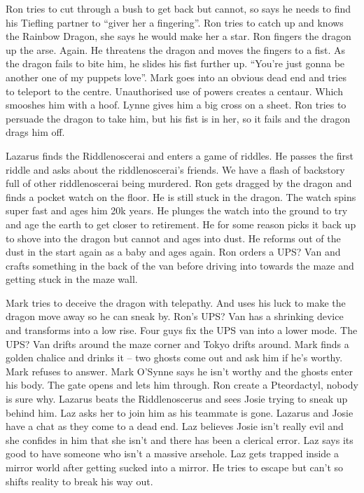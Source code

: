 Ron tries to cut through a bush to get back but cannot, so says he needs to find his Tiefling partner to “giver her a fingering”. Ron tries to catch up and knows the Rainbow Dragon, she says he would make her a star. Ron fingers the dragon up the arse. Again. He threatens the dragon and moves the fingers to a fist. As the dragon fails to bite him, he slides his fist further up. “You’re just gonna be another one of my puppets love”. Mark goes into an obvious dead end and tries to teleport to the centre. Unauthorised use of powers creates a centaur. Which smooshes him with a hoof. Lynne gives him a big cross on a sheet. Ron tries to persuade the dragon to take him, but his fist is in her, so it fails and the dragon drags him off.\medskip

Lazarus finds the Riddlenoscerai and enters a game of riddles. He passes the first riddle and asks about the riddlenoscerai’s friends. We have a flash of backstory full of other riddlenoscerai being murdered. Ron gets dragged by the dragon and finds a pocket watch on the floor. He is still stuck in the dragon. The watch spins super fast and ages him 20k years. He plunges the watch into the ground to try and age the earth to get closer to retirement. He for some reason picks it back up to shove into the dragon but cannot and ages into dust. He reforms out of the dust in the start again as a baby and ages again. Ron orders a UPS? Van and crafts something in the back of the van before driving into towards the maze and getting stuck in the maze wall.\medskip

Mark tries to deceive the dragon with telepathy. And uses his luck to make the dragon move away so he can sneak by. Ron’s UPS? Van has a shrinking device and transforms into a low rise. Four guys fix the UPS van into a lower mode. The UPS? Van drifts around the maze corner and Tokyo drifts around. Mark finds a golden chalice and drinks it – two ghosts come out and ask him if he’s worthy. Mark refuses to answer. Mark O’Synne says he isn’t worthy and the ghosts enter his body. The gate opens and lets him through. Ron create a Pteordactyl, nobody is sure why. Lazarus beats the Riddlenoscerus and sees Josie trying to sneak up behind him. Laz asks her to join him as his teammate is gone. Lazarus and Josie have a chat as they come to a dead end. Laz believes Josie isn’t really evil and she confides in him that she isn’t and there has been a clerical error. Laz says its good to have someone who isn’t a massive arsehole. Laz gets trapped inside a mirror world after getting sucked into a mirror. He tries to escape but can’t so shifts reality to break his way out.\medskip


